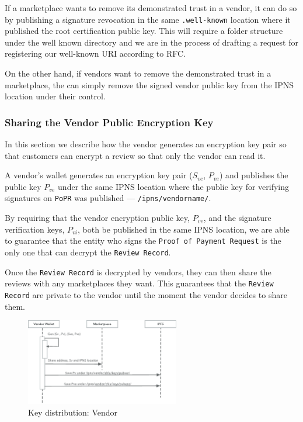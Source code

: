 \documentclass[a4paper]{article}
\begin{document}
If a marketplace wants to remove its demonstrated trust in a vendor,
it can do so by publishing a signature revocation in the same
\texttt{.well-known} location where it published the root
certification public key. This will require a folder structure under
the well known directory and we are in the process of drafting a
request for registering our well-known URI according to
RFC\cite{wellknown}.

On the other hand, if vendors want to remove the demonstrated trust in
a marketplace, the can simply remove the signed vendor public key from
the IPNS location under their control.

\subsubsection{Sharing the Vendor Public Encryption Key}

In this section we describe how the vendor generates an encryption key
pair so that customers can encrypt a review so that only the vendor
can read it.

A vendor's wallet generates an encryption key pair ($S_{ve}$,
$P_{ve}$) and publishes the public key $P_{ve}$ under the same IPNS
location where the public key for verifying signatures on
\texttt{PoPR} was published --- \texttt{/ipns/vendorname/}.

By requiring that the vendor encryption public key, $P_{ve}$, and the
signature verification keys, $P_{vi}$, both be published in the same
IPNS location, we are able to guarantee that the entity who signs the
\texttt{Proof of Payment Request} is the only one that can decrypt the
\texttt{Review Record}.

Once the \texttt{Review Record} is decrypted by vendors, they can then
share the reviews with any marketplaces they want. This guarantees
that the \texttt{Review Record} are private to the vendor until the
moment the vendor decides to share them.

\begin{figure}
\centering
\includegraphics[width=0.6\textwidth]{../vendor-wallet-init.eps}
\caption{\label{fig:vendor-wallet-init}Key distribution: Vendor}
\end{figure}
\end{document}
